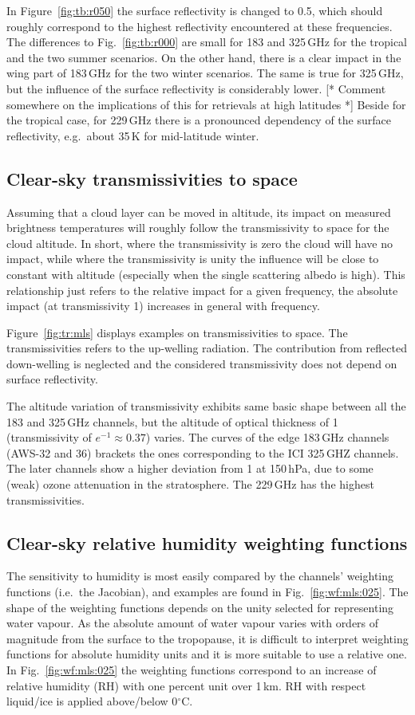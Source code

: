 \documentclass[12pt]{article}
\begin{document}
In Figure~\ref{fig:tb:r050} the surface reflectivity is changed to 0.5, which
should roughly correspond to the highest reflectivity encountered at these
frequencies. The differences to Fig.~\ref{fig:tb:r000}  are small for 183 and
325\,GHz for the tropical and the two summer scenarios. On the other hand,
there is a clear impact in the wing part of 183\,GHz for the two winter
scenarios. The same is true for 325\,GHz, but the influence of the surface
reflectivity is considerably lower. [* Comment somewhere on the implications of
this for retrievals at high latitudes *] Beside for the tropical case, for
229\,GHz there is a pronounced dependency of the surface reflectivity, e.g.\
about 35\,K for mid-latitude winter.


\subsection{Clear-sky transmissivities to space}
%
Assuming that a cloud layer can be moved in altitude, its impact on measured
brightness temperatures will roughly follow the transmissivity to space for the
cloud altitude. In short, where the transmissivity is zero the cloud will have
no impact, while where the transmissivity is unity the influence will be close
to constant with altitude (especially when the single scattering albedo is
high). This relationship just refers to the relative impact for a
given frequency, the absolute impact (at transmissivity 1) increases in general
with frequency. 

Figure~\ref{fig:tr:mls} displays examples on transmissivities to space. The
transmissivities refers to the up-welling radiation. The contribution from
reflected down-welling is neglected and the considered transmissivity does not
depend on surface reflectivity.

The altitude variation of transmissivity exhibits same basic shape between all
the 183 and 325\,GHz channels, but the altitude of optical thickness of 1
(transmissivity of $e^{-1}\approx0.37$) varies. The curves of the edge 183\,GHz
channels (AWS-32 and 36) brackets the ones corresponding to the ICI 325\,GHZ
channels. The later channels show a higher deviation from 1 at 150\,hPa, due to
some (weak) ozone attenuation in the stratosphere. The 229\,GHz has the highest
transmissivities.


\subsection{Clear-sky relative humidity weighting functions}
%
The sensitivity to humidity is most easily compared by the channels' weighting
functions (i.e.\ the Jacobian), and examples are found in
Fig.~\ref{fig:wf:mls:025}. The shape of the weighting functions depends on the
unity selected for representing water vapour. As the absolute amount of water
vapour varies with orders of magnitude from the surface to the tropopause, it
is difficult to interpret weighting functions for absolute humidity units and
it is more suitable to use a relative one. In Fig.~\ref{fig:wf:mls:025} the
weighting functions correspond to an increase of relative humidity (RH) with one
percent unit over 1\,km. RH with respect liquid/ice is applied above/below
0$^\circ$C.
\end{document}
